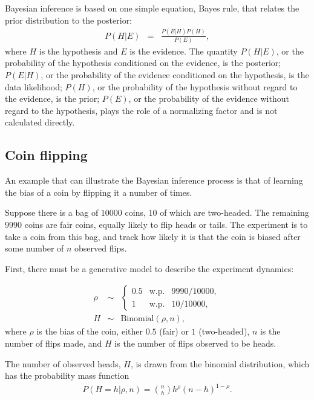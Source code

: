 Bayesian inference is based on one simple equation, Bayes rule, that relates the prior distribution to the posterior:
\begin{eqnarray}
\label{intro:eqn:bayes} P(H|E) &=& \frac{P(E|H)P(H)}{P(E)},
\end{eqnarray}
where $H$ is the hypothesis and $E$ is the evidence. The quantity $P(H|E)$, or the probability of the hypothesis conditioned on the evidence, is the posterior; $P(E|H)$, or the probability of the evidence conditioned on the hypothesis, is the data likelihood; $P(H)$, or the probability of the hypothesis without regard to the evidence, is the prior; $P(E)$, or the probability of the evidence without regard to the hypothesis, plays the role of a normalizing factor and is not calculated directly.

\subsection{Coin flipping}
\label{sec:intro:coin-flipping}
An example that can illustrate the Bayesian inference process is that of learning the bias of a coin by flipping it a number of times.

Suppose there is a bag of $10000$ coins, $10$ of which are two-headed. The remaining $9990$ coins are fair coins, equally likely to flip heads or tails. The experiment is to take a coin from this bag, and track how likely it is that the coin is biased after some number of $n$ observed flips.

First, there must be a generative model to describe the experiment dynamics:

\begin{eqnarray}
\label{intro:eqn:coinbag}\rho &\sim&
\left\{\begin{array}{lll}
0.5 & \mbox{w.p.} & 9990/10000,\\
1 & \mbox{w.p.} & 10/10000,
\end{array}\right.\\
\label{}H &\sim& \mbox{Binomial}(\rho, n),
\end{eqnarray}
where $\rho$ is the bias of the coin, either $0.5$ (fair) or $1$ (two-headed), $n$ is the number of flips made, and $H$ is the number of flips observed to be heads.

The number of observed heads, $H$, is drawn from the binomial distribution, which has the probability mass function 
\begin{eqnarray}
\label{intro:eqn:binomial} P(H=h|\rho, n) = {n \choose h} h^\rho (n-h)^{1-\rho}.
\end{eqnarray}

